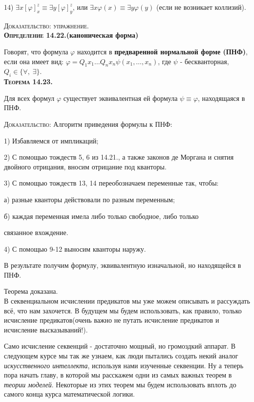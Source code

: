 \documentclass[18pt, a4paper]{extarticle}
\begin{document}
14) $\exists x[\varphi]^z_x\equiv\exists y[\varphi]^z_y$, или $\exists x\varphi(x)\equiv\exists y\varphi(y)$ (если не возникает коллизий).

\textsc{Доказательство: упражнение.}\\

\textbf{\textsc{Определение 14.22.}(каноническая форма)} 

Говорят, что формула $\varphi$ находится в \textbf{предваренной нормальной форме (ПНФ)}, если она имеет вид: $\varphi=Q_1x_1\dots Q_nx_n\psi(x_1,\dots,x_n)$, где $\psi$ -  бескванторная, $Q_i\in\{\forall,\;\exists\}$.\\

\textbf{\textsc{Теорема 14.23.}} 

Для всех формул $\varphi$ существует эквивалентная ей формула $\psi\equiv\varphi$, находящаяся в ПНФ.

\textsc{Доказательство:} Алгоритм приведения формулы к ПНФ:

1) Избавляемся от импликаций;

2) С помощью тождеств 5, 6 из 14.21., а также законов де Моргана и снятия двойного отрицания, вносим отрицание под кванторы.

3) С помощью тождеств 13, 14 переобозначаем переменные так, чтобы:

\qquad а) разные кванторы действовали по разным переменным;

\qquad б) каждая переменная имела либо только свободное, либо только

\qquad\qquad связанное вхождение.

4) С помощью 9-12 выносим кванторы наружу.

В результате получим формулу, эквивалентную изначальной, но находящейся в ПНФ.

Теорема доказана.\\

В секвенциальном исчислении предикатов мы уже можем описывать и рассуждать всё, что нам захочется. В будущем мы будем использовать, как правило, только исчисление предикатов(очень важно не путать исчисление предикатов и исчисление высказываний!). 

Само исчисление секвенций - достаточно мощный, но громоздкий аппарат. В следующем курсе мы так же узнаем, как люди пытались создать некий аналог \textit{искусственного интеллекта}, используя нами изученные секвенции. Ну а теперь пора начать главу, в которой мы расскажем одни из самых важных теорем в \textit{теории моделей}. Некоторые из этих теорем мы будем использовать вплоть до самого конца курса математической логики.
\end{document}
